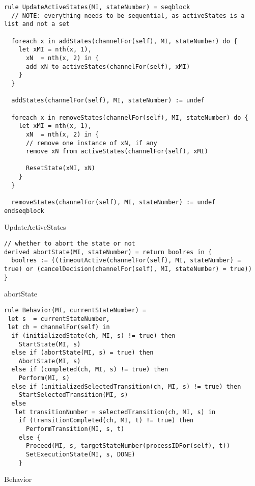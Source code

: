 \begin{listing}[H]
\begin{verbatim}
rule UpdateActiveStates(MI, stateNumber) = seqblock
  // NOTE: everything needs to be sequential, as activeStates is a list and not a set

  foreach x in addStates(channelFor(self), MI, stateNumber) do {
    let xMI = nth(x, 1),
      xN  = nth(x, 2) in {
      add xN to activeStates(channelFor(self), xMI)
    }
  }

  addStates(channelFor(self), MI, stateNumber) := undef

  foreach x in removeStates(channelFor(self), MI, stateNumber) do {
    let xMI = nth(x, 1),
      xN  = nth(x, 2) in {
      // remove one instance of xN, if any
      remove xN from activeStates(channelFor(self), xMI)

      ResetState(xMI, xN)
    }
  }

  removeStates(channelFor(self), MI, stateNumber) := undef
endseqblock
\end{verbatim}
\caption{UpdateActiveStates}
\label{lst:asm:UpdateActiveStates}
\end{listing}




\begin{listing}[H]
\begin{verbatim}
// whether to abort the state or not
derived abortState(MI, stateNumber) = return boolres in {
  boolres := ((timeoutActive(channelFor(self), MI, stateNumber) = true) or (cancelDecision(channelFor(self), MI, stateNumber) = true))
}
\end{verbatim}
\caption{abortState}
\label{lst:asm:abortState}
\end{listing}




\begin{listing}[H]
\begin{verbatim}
rule Behavior(MI, currentStateNumber) =
 let s  = currentStateNumber,
 let ch = channelFor(self) in
  if (initializedState(ch, MI, s) != true) then
    StartState(MI, s)
  else if (abortState(MI, s) = true) then
    AbortState(MI, s)
  else if (completed(ch, MI, s) != true) then
    Perform(MI, s)
  else if (initializedSelectedTransition(ch, MI, s) != true) then
    StartSelectedTransition(MI, s)
  else
   let transitionNumber = selectedTransition(ch, MI, s) in
    if (transitionCompleted(ch, MI, t) != true) then
      PerformTransition(MI, s, t)
    else {
      Proceed(MI, s, targetStateNumber(processIDFor(self), t))
      SetExecutionState(MI, s, DONE)
    }
\end{verbatim}
\caption{Behavior}
\label{lst:asm:Behavior}
\end{listing}




